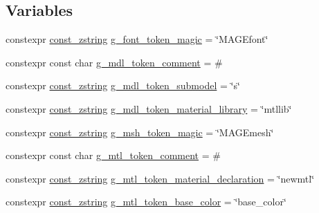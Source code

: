 \subsection*{Variables}
\begin{DoxyCompactItemize}
\item 
constexpr \mbox{\hyperlink{namespacemage_abfd9206dc607ceb5d13ec68bf075a5c0}{const\+\_\+zstring}} \mbox{\hyperlink{namespacemage_1_1rendering_1_1loader_acc723a2644e074318376fec3a8278711}{g\+\_\+font\+\_\+token\+\_\+magic}} = \char`\"{}M\+A\+G\+Efont\char`\"{}
\item 
constexpr const char \mbox{\hyperlink{namespacemage_1_1rendering_1_1loader_accd79e03f94cc56cddd761a16d7d054e}{g\+\_\+mdl\+\_\+token\+\_\+comment}} = \textquotesingle{}\#\textquotesingle{}
\item 
constexpr \mbox{\hyperlink{namespacemage_abfd9206dc607ceb5d13ec68bf075a5c0}{const\+\_\+zstring}} \mbox{\hyperlink{namespacemage_1_1rendering_1_1loader_a007345d2fdd9db8cedb0a50ff2bface7}{g\+\_\+mdl\+\_\+token\+\_\+submodel}} = \char`\"{}s\char`\"{}
\item 
constexpr \mbox{\hyperlink{namespacemage_abfd9206dc607ceb5d13ec68bf075a5c0}{const\+\_\+zstring}} \mbox{\hyperlink{namespacemage_1_1rendering_1_1loader_ae399195268d14aceb61ebf3c020d0690}{g\+\_\+mdl\+\_\+token\+\_\+material\+\_\+library}} = \char`\"{}mtllib\char`\"{}
\item 
constexpr \mbox{\hyperlink{namespacemage_abfd9206dc607ceb5d13ec68bf075a5c0}{const\+\_\+zstring}} \mbox{\hyperlink{namespacemage_1_1rendering_1_1loader_ac002ee9ece4bdae053226c72336f84e3}{g\+\_\+msh\+\_\+token\+\_\+magic}} = \char`\"{}M\+A\+G\+Emesh\char`\"{}
\item 
constexpr const char \mbox{\hyperlink{namespacemage_1_1rendering_1_1loader_aa434371c99d44cc729773cec213def03}{g\+\_\+mtl\+\_\+token\+\_\+comment}} = \textquotesingle{}\#\textquotesingle{}
\item 
constexpr \mbox{\hyperlink{namespacemage_abfd9206dc607ceb5d13ec68bf075a5c0}{const\+\_\+zstring}} \mbox{\hyperlink{namespacemage_1_1rendering_1_1loader_a169d9aa2df11fab271c025c0937f1126}{g\+\_\+mtl\+\_\+token\+\_\+material\+\_\+declaration}} = \char`\"{}newmtl\char`\"{}
\item 
constexpr \mbox{\hyperlink{namespacemage_abfd9206dc607ceb5d13ec68bf075a5c0}{const\+\_\+zstring}} \mbox{\hyperlink{namespacemage_1_1rendering_1_1loader_a374c1913982c15a9b219effa2e11cad7}{g\+\_\+mtl\+\_\+token\+\_\+base\+\_\+color}} = \char`\"{}base\+\_\+color\char`\"{}
\item 

\end{DoxyCompactItemize}
